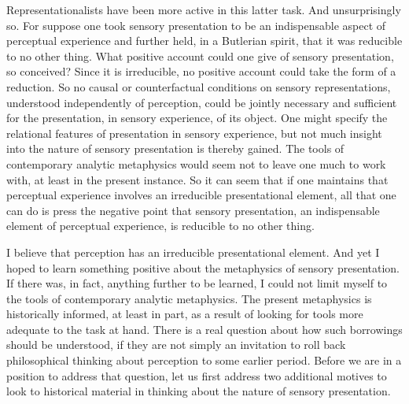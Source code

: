 Representationalists have been more active in this latter task. And unsurprisingly so. For suppose one took sensory presentation to be an indispensable aspect of perceptual experience and further held, in a Butlerian spirit, that it was reducible to no other thing. What positive account could one give of sensory presentation, so conceived? Since it is irreducible, no positive account could take the form of a reduction. So no causal or counterfactual conditions on sensory representations, understood independently of perception, could be jointly necessary and sufficient for the presentation, in sensory experience, of its object. One might specify the relational features of presentation in sensory experience, but not much insight into the nature of sensory presentation is thereby gained. The tools of contemporary analytic metaphysics would seem not to leave one much to work with, at least in the present instance. So it can seem that if one maintains that perceptual experience involves an irreducible presentational element, all that one can do is press the negative point that sensory presentation, an indispensable element of perceptual experience, is reducible to no other thing.

I believe that perception has an irreducible presentational element. And yet I hoped to learn something positive about the metaphysics of sensory presentation. If there was, in fact, anything further to be learned, I could not limit myself to the tools of contemporary analytic metaphysics. The present metaphysics is historically informed, at least in part, as a result of looking for tools more adequate to the task at hand. There is a real question about how such borrowings should be understood, if they are not simply an invitation to roll back philosophical thinking about perception to some earlier period. Before we are in a position to address that question, let us first address two additional motives to look to historical material in thinking about the nature of sensory presentation.

